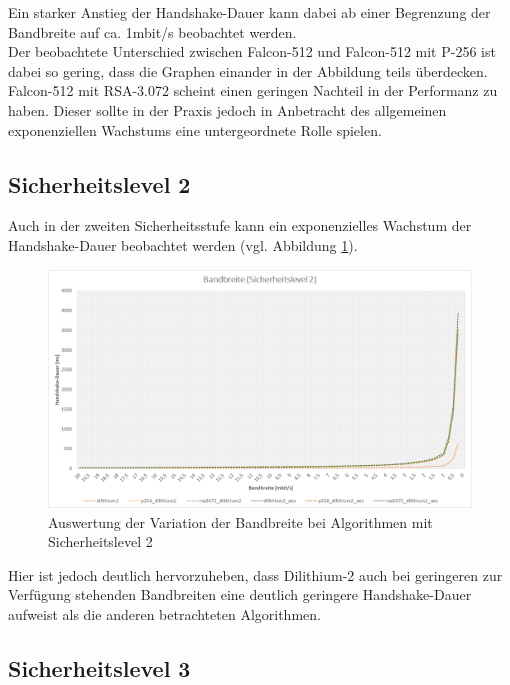 		Ein starker Anstieg der Handshake-Dauer kann dabei ab einer Begrenzung der Bandbreite auf ca. 1mbit/s beobachtet werden.\\
		
		Der beobachtete Unterschied zwischen Falcon-512 und Falcon-512 mit P-256 ist dabei so gering, dass die Graphen einander in der Abbildung teils überdecken.\\
		
		Falcon-512 mit RSA-3.072 scheint einen geringen Nachteil in der Performanz zu haben. Dieser sollte in der Praxis jedoch in Anbetracht des allgemeinen exponenziellen Wachstums eine untergeordnete Rolle spielen.
		
		\subsection{Sicherheitslevel 2}
		\label{subsec:ergebnis:bandbreite:sl2}
		
		Auch in der zweiten Sicherheitsstufe kann ein exponenzielles Wachstum der Handshake-Dauer beobachtet werden (vgl. Abbildung \ref{fig:ergebnis:bandbreite:sl2}).\\
		
		\begin{figure}[htbp]
			\centering
			\includegraphics[width=\textwidth]{../auswertung/bandbreite_sl2.png}
			\caption{Auswertung der Variation der Bandbreite bei Algorithmen mit Sicherheitslevel 2}
			\label{fig:ergebnis:bandbreite:sl2}
		\end{figure}
		
		Hier ist jedoch deutlich hervorzuheben, dass Dilithium-2 auch bei geringeren zur Verfügung stehenden Bandbreiten eine deutlich geringere Handshake-Dauer aufweist als die anderen betrachteten Algorithmen.
		
		\subsection{Sicherheitslevel 3}
		\label{subsec:ergebnis:bandbreite:sl3}
		
